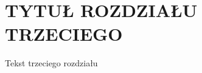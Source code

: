 \chapter{TYTUŁ ROZDZIAŁU  TRZECIEGO}

{\markboth{}{}
\setlength{\parskip}{1.2ex plus 0.5ex minus 0.2ex}
\baselineskip 0.6cm

Tekst trzeciego rozdziału

}